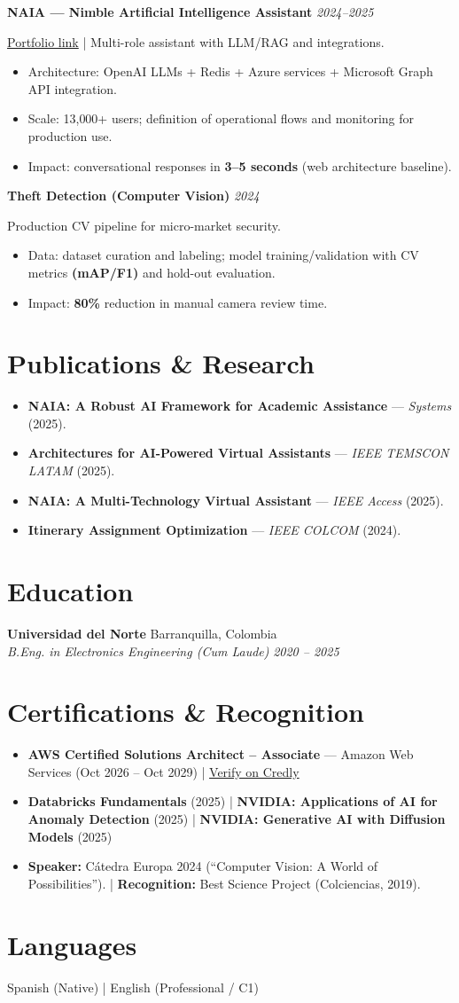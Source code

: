 \documentclass[letterpaper,10pt]{article}
\newcommand{\resumeItem}[1]{\item \small{#1}}
\newcommand{\resumeSubheading}[4]{%
  \textbf{#1} \hfill #2 \\
  \textit{\small #3} \hfill \textit{\small #4} \\
  \vspace{-2pt}
}
\newcommand{\resumeProject}[3]{%
  \par\noindent\textbf{#1} \hfill \textit{\small #2} \par
  \noindent\small #3 \par
}
\newcommand{\projectGap}{\vspace{6pt}}
\begin{document}
\resumeProject
{NAIA --- Nimble Artificial Intelligence Assistant}{2024--2025}
{\href{https://www.adrianpabonmendoza.com/}{Portfolio link} \;|\; Multi-role assistant with LLM/RAG and integrations.}
\begin{itemize}
  \resumeItem{Architecture: OpenAI LLMs + Redis + Azure services + Microsoft Graph API integration.}
  \resumeItem{Scale: 13{,}000+ users; definition of operational flows and monitoring for production use.}
  \resumeItem{Impact: conversational responses in \textbf{3--5 seconds} (web architecture baseline).}
\end{itemize}
\projectGap

\resumeProject
{Theft Detection (Computer Vision)}{2024}
{Production CV pipeline for micro-market security.}
\begin{itemize}
  \resumeItem{Data: dataset curation and labeling; model training/validation with CV metrics \textbf{(mAP/F1)} and hold-out evaluation.}
  \resumeItem{Impact: \textbf{80\%} reduction in manual camera review time.}
\end{itemize}

\section{Publications \& Research}
\begin{itemize}
  \resumeItem{\textbf{NAIA: A Robust AI Framework for Academic Assistance} --- \textit{Systems} (2025).}
  \resumeItem{\textbf{Architectures for AI-Powered Virtual Assistants} --- \textit{IEEE TEMSCON LATAM} (2025).}
  \resumeItem{\textbf{NAIA: A Multi-Technology Virtual Assistant} --- \textit{IEEE Access} (2025).}
  \resumeItem{\textbf{Itinerary Assignment Optimization} --- \textit{IEEE COLCOM} (2024).}
\end{itemize}

\section{Education}
\resumeSubheading
{Universidad del Norte}{Barranquilla, Colombia}
{B.Eng. in Electronics Engineering (Cum Laude)}{2020 -- 2025}

\section{Certifications \& Recognition}
\begin{itemize}
  \resumeItem{\textbf{AWS Certified Solutions Architect -- Associate} --- Amazon Web Services (Oct 2026 -- Oct 2029) \;|\; \href{https://www.credly.com/badges/c1b996bf-6ad3-4f0d-b936-1088787ad5c1/public_url}{Verify on Credly}}
  \resumeItem{\textbf{Databricks Fundamentals} (2025) \;|\; \textbf{NVIDIA: Applications of AI for Anomaly Detection} (2025) \;|\; \textbf{NVIDIA: Generative AI with Diffusion Models} (2025)}
  \resumeItem{\textbf{Speaker:} Cátedra Europa 2024 (``Computer Vision: A World of Possibilities''). \;|\; \textbf{Recognition:} Best Science Project (Colciencias, 2019).}
\end{itemize}

\section{Languages}
\small Spanish (Native) \;|\; English (Professional / C1)
\end{document}
